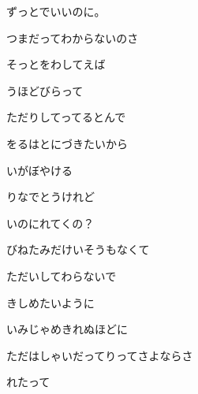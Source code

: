 \documentclass[a4paper,tate,twocolumn,12pt]{ltjtarticle}
\begin{document}
\thispagestyle{empty}

\begin{center}
{\LARGE {}}

{\large ずっとでいいのに。}
\end{center}

\vspace{1em}

\begin{flushleft}

\noindent\begin{minipage}{\linewidth}
つまだってわからないのさ

そっとをわしてえば

うほどびらって

ただりしてってるとんで

をるはとにづきたいから
\end{minipage}

\vspace{2em}

\noindent\begin{minipage}{\linewidth}
いがぼやける

りなでとうけれど

いのにれてくの？

びねたみだけいそうもなくて
\end{minipage}

\vspace{2em}

\noindent\begin{minipage}{\linewidth}
ただいしてわらないで

きしめたいように

いみじゃめきれぬほどに

ただはしゃいだってりってさよならさ

れたって


\end{minipage}
\end{flushleft}
\end{document}
